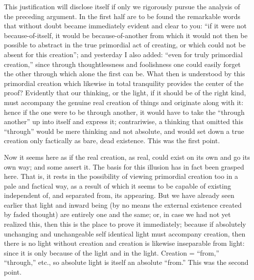 This justification will disclose itself
if only we rigorously pursue
the analysis of the preceding argument.
In the first half are to be found
the remarkable words that without doubt
became immediately evident and clear to you:
“if it were not because-of-itself,
it would be because-of-another
from which it would not then be possible
to abstract in the true primordial act of creating,
or which could not be absent for this creation”;
and yesterday I also added:
“even for truly primordial creation,”
since through thoughtlessness and foolishness
one could easily forget the other through
which alone the first can be.
What then is understood by this primordial creation
which likewise in total tranquility
provides the center of the proof?
Evidently that our thinking, or the light,
if it should be of the right kind,
must accompany the genuine real creation of things
and originate along with it:
hence if the one were to be through another,
it would have to take the “through another”
up into itself and express it;
contrariwise, a thinking that omitted this “through”
would be mere thinking and not absolute,
and would set down a true creation
only factically as bare, dead existence.
This was the first point.

Now it seems here as if the real creation, as real,
could exist on its own and go its own way; and some assert it.
The basis for this illusion has in fact been grasped here.
That is, it rests in the possibility of viewing
primordial creation too in a pale and factical way,
as a result of which it seems to be capable of
existing independent of, and separated from, its appearing.
But we have already seen earlier that light and inward being
(by no means the external existence created by faded thought)
are entirely one and the same;
or, in case we had not yet realized this,
then this is the place to prove it immediately;
because if absolutely unchanging and unchangeable
self identical light must accompany creation,
then there is no light without creation
and creation is likewise inseparable from light:
since it is only because of the light and in the light.
Creation = “from,” “through,” etc.,
so absolute light is itself an absolute “from.”
This was the second point.

